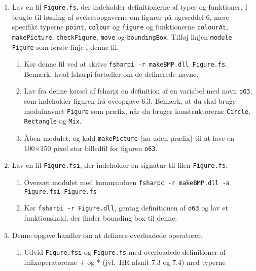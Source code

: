 \documentclass[a4paper]{article}
\begin{document}
\begin{enumerate}[ø1.]

\item Lav en fil \texttt{Figure.fs}, der indeholder definitionerne af
  typer og funktioner, I brugte til løsning af øvelsesopgaverne om
  figurer på ugeseddel 6, mere specifikt typerne \texttt{point},
  \texttt{colour} og \texttt{figure} og funktionerne
  \texttt{colourAt}, \texttt{makePicture}, \texttt{checkFigure},
  \texttt{move} og \texttt{boundingBox}.  Tilføj linjen \texttt{module
    Figure} som første linje i denne fil.

  \begin{enumerate}
  \item Kør denne fil ved at skrive \texttt{fsharpi -r makeBMP.dll
    Figure.fs}.  Bemærk, hvad fsharpi fortæller om de definerede navne.

  \item Lav fra denne kørsel af fsharpi en definition af en variabel
    med navn \texttt{o63}, som indeholder figuren frå øveopgave 6.3.
    Bemærk, at du skal bruge modulnavnet \texttt{Figure} som præfix,
    når du bruger konstruktorerne \texttt{Circle}, \texttt{Rectangle}
    og \texttt{Mix}.

  \item Åben modulet, og kald \texttt{makePicture} (nu uden præfix)
    til at lave en 100×150 pixel stor billedfil for figuren \texttt{o63}.
  \end{enumerate}

\item Lav en fil \texttt{Figure.fsi}, der indeholder en signatur til filen
  \texttt{Figure.fs}.

  \begin{enumerate}
  \item Oversæt modulet med kommandoen \texttt{fsharpc -r
    makeBMP.dll -a Figure.fsi Figure.fs}

  \item Kør \texttt{fsharpi -r Figure.dll}, gentag definitionen af
    \texttt{o63} og lav et funktionskald, der finder bounding box til
    denne.
  \end{enumerate}

\item Denne opgave handler om at definere overloadede operatorer.

  \begin{enumerate}
  \item  Udvid \texttt{Figure.fsi} og \texttt{Figure.fs} med overloadede
  definitioner af infixoperatorerne + og * (jvf.\ HR afsnit 7.3 og
  7.4) med typerne


\end{enumerate}
\end{enumerate}
\end{document}
